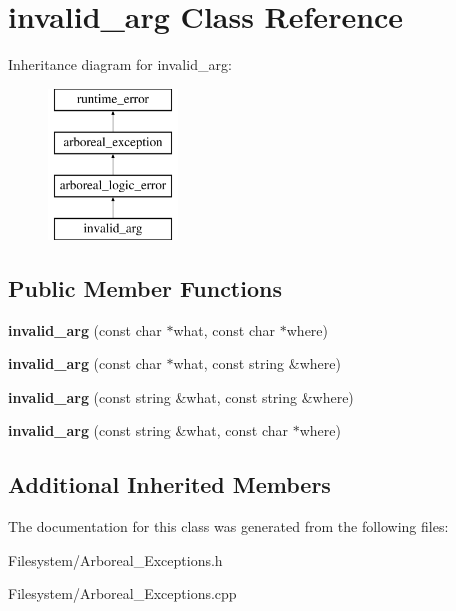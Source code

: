 \hypertarget{classinvalid__arg}{}\section{invalid\+\_\+arg Class Reference}
\label{classinvalid__arg}
Inheritance diagram for invalid\+\_\+arg\+:\begin{figure}[H]
\begin{center}
\leavevmode
\includegraphics[height=4.000000cm]{classinvalid__arg}
\end{center}
\end{figure}
\subsection*{Public Member Functions}
\begin{DoxyCompactItemize}
\item 
\mbox{\label{classinvalid__arg_a47a6d404f08083db4243703c091fff76}} 
{\bfseries invalid\+\_\+arg} (const char $\ast$what, const char $\ast$where)
\item 
\mbox{\label{classinvalid__arg_ad3f909f981cd5b8ad1b5efe8afbe5ba1}} 
{\bfseries invalid\+\_\+arg} (const char $\ast$what, const string \&where)
\item 
\mbox{\label{classinvalid__arg_aac8373819f9c70bb5fb811e991e48dc3}} 
{\bfseries invalid\+\_\+arg} (const string \&what, const string \&where)
\item 
\mbox{\label{classinvalid__arg_a6c4ad9d89bdc9a63cdad04f4d2e8ca4f}} 
{\bfseries invalid\+\_\+arg} (const string \&what, const char $\ast$where)
\end{DoxyCompactItemize}
\subsection*{Additional Inherited Members}


The documentation for this class was generated from the following files\+:\begin{DoxyCompactItemize}
\item 
Filesystem/Arboreal\+\_\+\+Exceptions.\+h\item 
Filesystem/Arboreal\+\_\+\+Exceptions.\+cpp\end{DoxyCompactItemize}
